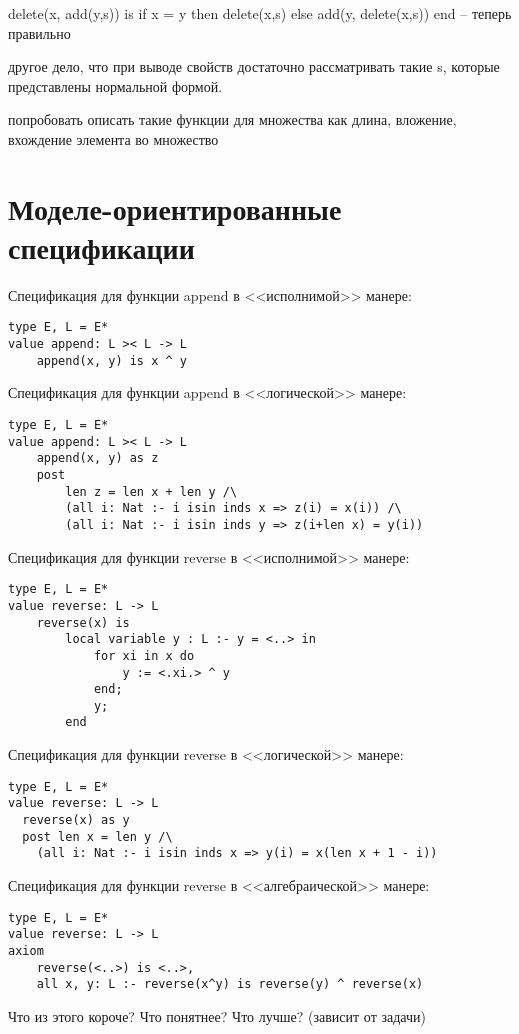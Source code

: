 \documentclass[14pt, twoside]{extreport}
\makeatletter
\renewcommand\appendix{\par
  \setcounter{chapter}{0}%
  \setcounter{section}{0}%
  \def\@chapapp{\appendixname}%
  \def\thechapter{\@Asbuk\c@chapter}}
\makeatother
\begin{document}
delete(x, add(y,s)) is if x = y then delete(x,s) else add(y, delete(x,s)) end -- теперь правильно

другое дело, что при выводе свойств достаточно рассматривать такие s, которые представлены нормальной формой.


попробовать описать такие функции для множества как длина, вложение, вхождение элемента во множество



\chapter{Моделе-ориентированные спецификации}



Спецификация для функции append в <<исполнимой>> манере:
\begin{lstlisting}
type E, L = E*
value append: L >< L -> L
    append(x, y) is x ^ y
\end{lstlisting}

Спецификация для функции append в <<логической>> манере:
\begin{lstlisting}
type E, L = E*
value append: L >< L -> L
    append(x, y) as z
    post
        len z = len x + len y /\
        (all i: Nat :- i isin inds x => z(i) = x(i)) /\
        (all i: Nat :- i isin inds y => z(i+len x) = y(i))
\end{lstlisting}

Спецификация для функции reverse в <<исполнимой>> манере:
\begin{lstlisting}
type E, L = E*
value reverse: L -> L
    reverse(x) is
        local variable y : L :- y = <..> in
            for xi in x do
                y := <.xi.> ^ y
            end;
            y;
        end
\end{lstlisting}

Спецификация для функции reverse в <<логической>> манере:
\begin{lstlisting}
type E, L = E*
value reverse: L -> L
  reverse(x) as y
  post len x = len y /\
    (all i: Nat :- i isin inds x => y(i) = x(len x + 1 - i))
\end{lstlisting}

Спецификация для функции reverse в <<алгебраической>> манере:
\begin{lstlisting}
type E, L = E*
value reverse: L -> L
axiom
    reverse(<..>) is <..>,
    all x, y: L :- reverse(x^y) is reverse(y) ^ reverse(x)
\end{lstlisting}

Что из этого короче? Что понятнее? Что лучше? (зависит от задачи)


\appendix


\pagebreak
{}


\end{document}
